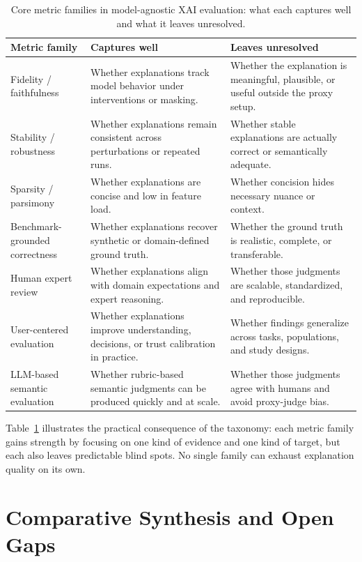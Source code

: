 \documentclass[10pt]{article}
\begin{document}
\begin{table}[t]
\centering
\caption{Core metric families in model-agnostic XAI evaluation: what
each captures well and what it leaves unresolved.}
\footnotesize
\begin{tabularx}{\linewidth}{l X X}
\toprule
\textbf{Metric family} & \textbf{Captures well} & \textbf{Leaves unresolved} \\
\midrule
Fidelity / faithfulness & Whether explanations track model behavior under interventions or masking. & Whether the explanation is meaningful, plausible, or useful outside the proxy setup. \\
Stability / robustness & Whether explanations remain consistent across perturbations or repeated runs. & Whether stable explanations are actually correct or semantically adequate. \\
Sparsity / parsimony & Whether explanations are concise and low in feature load. & Whether concision hides necessary nuance or context. \\
Benchmark-grounded correctness & Whether explanations recover synthetic or domain-defined ground truth. & Whether the ground truth is realistic, complete, or transferable. \\
Human expert review & Whether explanations align with domain expectations and expert reasoning. & Whether those judgments are scalable, standardized, and reproducible. \\
User-centered evaluation & Whether explanations improve understanding, decisions, or trust calibration in practice. & Whether findings generalize across tasks, populations, and study designs. \\
LLM-based semantic evaluation & Whether rubric-based semantic judgments can be produced quickly and at scale. & Whether those judgments agree with humans and avoid proxy-judge bias. \\
\bottomrule
\end{tabularx}
\label{tab:taxonomy_families}
\end{table}

Table~\ref{tab:taxonomy_families} illustrates the practical consequence of
the taxonomy: each metric family gains strength by focusing on one kind
of evidence and one kind of target, but each also leaves predictable
blind spots. No single family can exhaust explanation quality on its own.

\section{Comparative Synthesis and Open Gaps}
\label{sec:synthesis}
\end{document}
